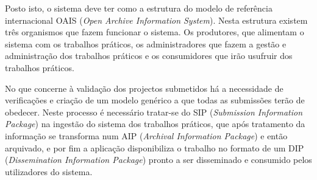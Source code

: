  Posto isto, o sistema deve ter como a estrutura do modelo de referência internacional OAIS 
 (\textit{Open Archive Information System}).
 Nesta estrutura existem três organismos que fazem funcionar o sistema. Os produtores, que 
 alimentam o sistema com os trabalhos práticos, os administradores que fazem a gestão e administração
 dos trabalhos práticos e os consumidores que irão usufruir dos trabalhos práticos. 
 
No que concerne à validação dos projectos submetidos há a necessidade de verificações e 
criação de um modelo genérico a que todas as submissões terão de obedecer. Neste processo
é necessário tratar-se do SIP (\textit{Submission Information Package}) na ingestão do sistema dos
trabalhos práticos, que após tratamento da informação se transforma num AIP (\textit{Archival 
Information Package}) e então arquivado, e por fim a aplicação disponibiliza o trabalho no formato
de um DIP (\textit{Dissemination Information Package}) pronto a ser disseminado e consumido pelos
utilizadores do sistema.
